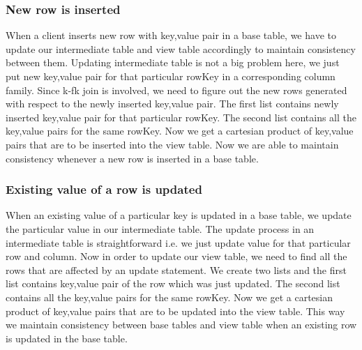 \documentclass[11pt,a4paper,bibtotoc,idxtotoc,headsepline,footsepline,footexclude,BCOR12mm,DIV13]{scrbook}
\begin{document}
\subsubsection{New row is inserted}
\label{New row is inserted JoinSelection}
When a client inserts new row with key,value pair in a base table, we have to update our intermediate table and view table accordingly to maintain consistency between them. Updating intermediate table is not a big problem here, we just put new key,value pair for that particular rowKey in a corresponding column family. Since k-fk join is involved, we need to figure out the new rows generated with respect to the newly inserted key,value pair. The first list contains newly inserted key,value pair for that particular rowKey. The second list contains all the key,value pairs for the same rowKey. Now we get a cartesian product of key,value pairs that are to be inserted into the view table. Now we are able to maintain consistency whenever a new row is inserted in a base table.

\subsubsection{Existing value of a row is updated} 
When an existing value of a particular key is updated in a base table, we update the particular value in our intermediate table. The update process in an intermediate table is straightforward i.e. we just update value for that particular row and column. Now in order to update our view table, we need to find all the rows that are affected by an update statement. We create two lists and the first list contains key,value pair of the row which was just updated. The second list contains all the key,value pairs for the same rowKey. Now we get a cartesian product of key,value pairs that are to be updated into the view table. This way we maintain consistency between base tables and view table when an existing row is updated in the base table.
\end{document}
